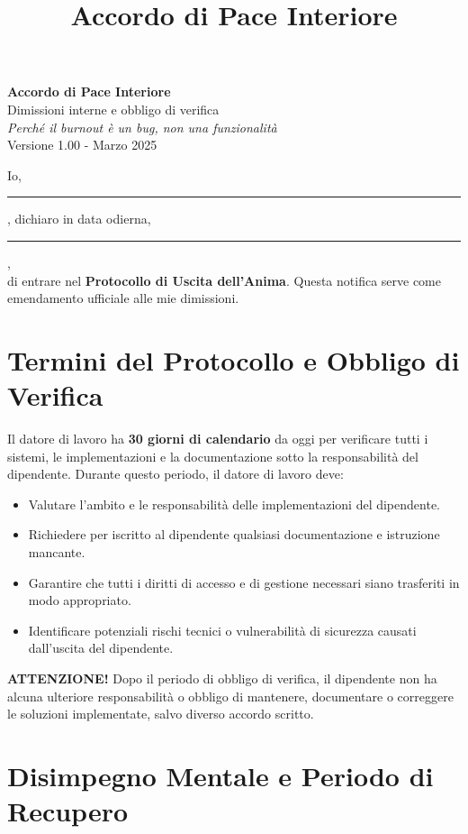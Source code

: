 \documentclass[a4paper,11pt]{article}
\title{Accordo di Pace Interiore}
\date{}
\begin{document}
\pagestyle{empty}

\begin{center}
    {\LARGE \textbf{Accordo di Pace Interiore}}\\[1em]
    {\large Dimissioni interne e obbligo di verifica}\\[0.5em]
    \textit{Perché il burnout è un bug, non una funzionalità}\\[0.5em]
    {\small Versione 1.00 - Marzo 2025}
\end{center}

\vspace{2em}

Io, \rule{7cm}{0.2pt}, dichiaro in data odierna, \rule{4cm}{0.2pt},\\
di entrare nel \textbf{Protocollo di Uscita dell'Anima}. Questa notifica serve come emendamento ufficiale alle mie dimissioni.

\section*{Termini del Protocollo e Obbligo di Verifica}

Il datore di lavoro ha \textbf{30 giorni di calendario} da oggi per verificare tutti i sistemi, le implementazioni e la documentazione sotto la responsabilità del dipendente. Durante questo periodo, il datore di lavoro deve:

\begin{itemize}
    \item Valutare l'ambito e le responsabilità delle implementazioni del dipendente.
    \item Richiedere per iscritto al dipendente qualsiasi documentazione e istruzione mancante.
    \item Garantire che tutti i diritti di accesso e di gestione necessari siano trasferiti in modo appropriato.
    \item Identificare potenziali rischi tecnici o vulnerabilità di sicurezza causati dall'uscita del dipendente.
\end{itemize}

\textbf{ATTENZIONE!} Dopo il periodo di obbligo di verifica, il dipendente non ha alcuna ulteriore responsabilità o obbligo di mantenere, documentare o correggere le soluzioni implementate, salvo diverso accordo scritto.

\section*{Disimpegno Mentale e Periodo di Recupero}
\end{document}
